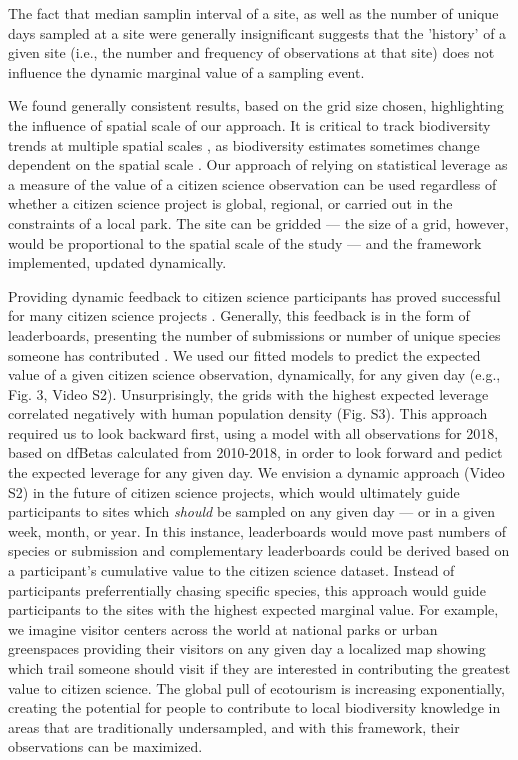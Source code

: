 \documentclass[9pt,twocolumn,twoside,lineno]{pnas-new}
\begin{document}
The fact that median samplin interval of a site, as well as the number of unique days sampled at a site were generally insignificant suggests that the 'history' of a given site (i.e., the number and frequency of observations at that site) does not influence the dynamic marginal value of a sampling event.

We found generally consistent results, based on the grid size chosen, highlighting the influence of spatial scale of our approach. It is critical to track biodiversity trends at multiple spatial scales \cite{soberon2007assessing}, as biodiversity estimates sometimes change dependent on the spatial scale \cite{chase2013scale}. Our approach of relying on statistical leverage as a measure of the value of a citizen science observation can be used regardless of whether a citizen science project is global, regional, or carried out in the constraints of a local park. The site can be gridded --- the size of a grid, however, would be proportional to the spatial scale of the study --- and the framework implemented, updated dynamically.

Providing dynamic feedback to citizen science participants has proved successful for many citizen science projects \cite{rowley2019frogid, wiggins2011conservation, xue2016avicaching}. Generally, this feedback is in the form of leaderboards, presenting the number of submissions or number of unique species someone has contributed \cite{wood2011ebird}. We used our fitted models to predict the expected value of a given citizen science observation, dynamically, for any given day (e.g., Fig. 3, Video S2). Unsurprisingly, the grids with the highest expected leverage correlated negatively with human population density (Fig. S3). This approach required us to look backward first, using a model with all observations for 2018, based on dfBetas calculated from 2010-2018, in order to look forward and pedict the expected leverage for any given day. We envision a dynamic approach (Video S2) in the future of citizen science projects, which would ultimately guide participants to sites which \textit{should} be sampled on any given day --- or in a given week, month, or year. In this instance, leaderboards would move past numbers of species or submission and complementary leaderboards could be derived based on a participant's cumulative value to the citizen science dataset. Instead of participants preferrentially chasing specific species, this approach would guide participants to the sites with the highest expected marginal value. For example, we imagine visitor centers across the world at national parks or urban greenspaces providing their visitors on any given day a localized map showing which trail someone should visit if they are interested in contributing the greatest value to citizen science. The global pull of ecotourism \cite{sharpley2006ecotourism} is increasing exponentially, creating the potential for people to contribute to local biodiversity knowledge in areas that are traditionally undersampled, and with this framework, their observations can be maximized.
\end{document}
